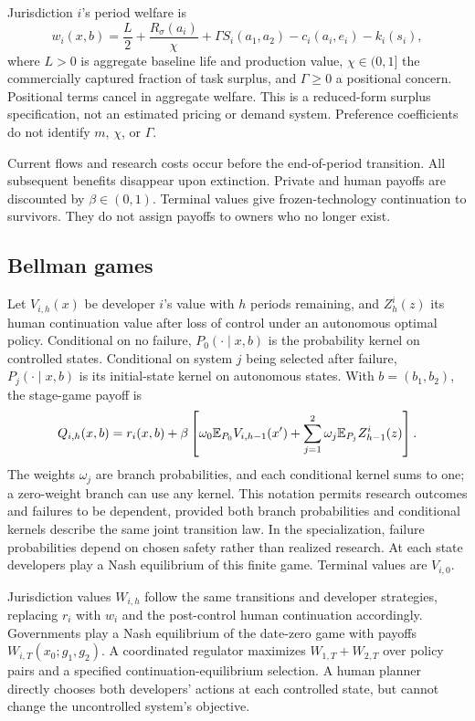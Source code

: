 Jurisdiction $i$'s period welfare is
\begin{equation}\label{eq:welfare}
 w_i(x,b)=\frac{L}{2}+\frac{R_\sigma(a_i)}{\chi}
       +\Gamma S_i(a_1,a_2)-c_i(a_i,e_i)-k_i(s_i),
\end{equation}
where $L>0$ is aggregate baseline life and production value, $\chi\in(0,1]$ the commercially captured fraction of task surplus, and $\Gamma\geq0$ a positional concern. Positional terms cancel in aggregate welfare. This is a reduced-form surplus specification, not an estimated pricing or demand system. Preference coefficients do not identify $m$, $\chi$, or $\Gamma$.

Current flows and research costs occur before the end-of-period transition. All subsequent benefits disappear upon extinction. Private and human payoffs are discounted by $\beta\in(0,1)$. Terminal values give frozen-technology continuation to survivors. They do not assign payoffs to owners who no longer exist.

\subsection{Bellman games}
Let $V_{i,h}(x)$ be developer $i$'s value with $h$ periods remaining, and $Z^i_h(z)$ its human continuation value after loss of control under an autonomous optimal policy. Conditional on no failure, $P_0(\cdot\mid x,b)$ is the probability kernel on controlled states. Conditional on system $j$ being selected after failure, $P_j(\cdot\mid x,b)$ is its initial-state kernel on autonomous states. With $b=(b_1,b_2)$, the stage-game payoff is
\begin{equation}\label{eq:Q}
 Q_{i,h}(x,b)=r_i(x,b)+\beta\left[
 \omega_0\mathbb E_{P_0}V_{i,h-1}(x')+\sum_{j=1}^2\omega_j\mathbb E_{P_j}Z^i_{h-1}(z)\right].
\end{equation}
The weights $\omega_j$ are branch probabilities, and each conditional kernel sums to one; a zero-weight branch can use any kernel. This notation permits research outcomes and failures to be dependent, provided both branch probabilities and conditional kernels describe the same joint transition law. In the specialization, failure probabilities depend on chosen safety rather than realized research. At each state developers play a Nash equilibrium of this finite game. Terminal values are $V_{i,0}$.

Jurisdiction values $W_{i,h}$ follow the same transitions and developer strategies, replacing $r_i$ with $w_i$ and the post-control human continuation accordingly. Governments play a Nash equilibrium of the date-zero game with payoffs $W_{i,T}(x_0;g_1,g_2)$. A coordinated regulator maximizes $W_{1,T}+W_{2,T}$ over policy pairs and a specified continuation-equilibrium selection. A human planner directly chooses both developers' actions at each controlled state, but cannot change the uncontrolled system's objective.

